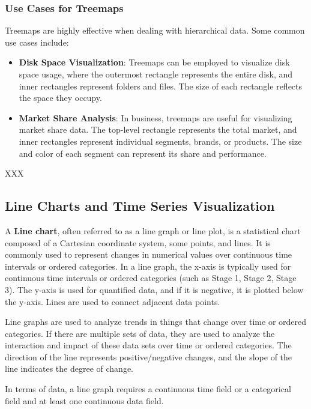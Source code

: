 \documentclass{article}\usepackage[]{graphicx}\usepackage[]{xcolor}
\begin{document}
\subsubsection{Use Cases for Treemaps}
Treemaps are highly effective when dealing with hierarchical data. Some common use cases include:
\begin{itemize}
\item \textbf{Disk Space Visualization}: Treemaps can be employed to visualize disk space usage, where the outermost rectangle represents the entire disk, and inner rectangles represent folders and files. The size of each rectangle reflects the space they occupy.
\item \textbf{Market Share Analysis}: In business, treemaps are useful for visualizing market share data. The top-level rectangle represents the total market, and inner rectangles represent individual segments, brands, or products. The size and color of each segment can represent its share and performance.
\end{itemize}

XXX %


\subsection{Line Charts and Time Series Visualization}

A \textbf{Line chart}, often referred to as a line graph or line plot, is a statistical chart composed of a Cartesian coordinate system, some points, and lines. It is commonly used to represent changes in numerical values over continuous time intervals or ordered categories. In a line graph, the x-axis is typically used for continuous time intervals or ordered categories (such as Stage 1, Stage 2, Stage 3). The y-axis is used for quantified data, and if it is negative, it is plotted below the y-axis. Lines are used to connect adjacent data points.

Line graphs are used to analyze trends in things that change over time or ordered categories. If there are multiple sets of data, they are used to analyze the interaction and impact of these data sets over time or ordered categories. The direction of the line represents positive/negative changes, and the slope of the line indicates the degree of change.

In terms of data, a line graph requires a continuous time field or a categorical field and at least one continuous data field.
\end{document}
